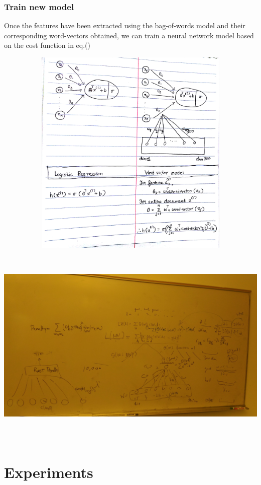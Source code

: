 \subsection{Train new model}

Once the features have been extracted using the bag-of-words model and their corresponding word-vectors obtained, we can train a neural network model based on the cost function in eq.() 

\includegraphics[width=16cm, height=10cm]{wordvec.jpg}\\[1cm]
\includegraphics[width=16cm, height=10cm]{cheng.jpg}\\[1cm]

\chapter{Experiments}

